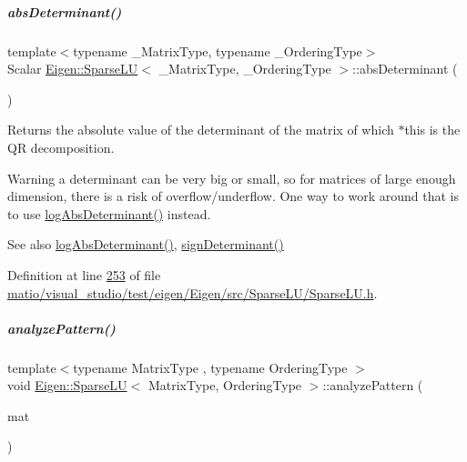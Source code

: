 \mbox{\label{group___sparse_l_u___module_a06fa89424239fb169d408f08252426d0}} 
\subparagraph{\texorpdfstring{abs\+Determinant()}{absDeterminant()}\hspace{0.1cm}{\footnotesize\ttfamily [2/2]}}
{\footnotesize\ttfamily template$<$typename \+\_\+\+Matrix\+Type, typename \+\_\+\+Ordering\+Type$>$ \\
Scalar \hyperlink{group___sparse_l_u___module_class_eigen_1_1_sparse_l_u}{Eigen\+::\+Sparse\+LU}$<$ \+\_\+\+Matrix\+Type, \+\_\+\+Ordering\+Type $>$\+::abs\+Determinant (\begin{DoxyParamCaption}{ }\end{DoxyParamCaption})\hspace{0.3cm}{\ttfamily [inline]}}

\begin{DoxyReturn}{Returns}
the absolute value of the determinant of the matrix of which $\ast$this is the QR decomposition.
\end{DoxyReturn}
\begin{DoxyWarning}{Warning}
a determinant can be very big or small, so for matrices of large enough dimension, there is a risk of overflow/underflow. One way to work around that is to use \hyperlink{group___sparse_l_u___module_a89e30a7df205596784a5a73f4768eaec}{log\+Abs\+Determinant()} instead.
\end{DoxyWarning}
\begin{DoxySeeAlso}{See also}
\hyperlink{group___sparse_l_u___module_a89e30a7df205596784a5a73f4768eaec}{log\+Abs\+Determinant()}, \hyperlink{group___sparse_l_u___module_a6651143e3b18fa90cfb3808b6fd23c4e}{sign\+Determinant()} 
\end{DoxySeeAlso}


Definition at line \hyperlink{matio_2visual__studio_2test_2eigen_2_eigen_2src_2_sparse_l_u_2_sparse_l_u_8h_source_l00253}{253} of file \hyperlink{matio_2visual__studio_2test_2eigen_2_eigen_2src_2_sparse_l_u_2_sparse_l_u_8h_source}{matio/visual\+\_\+studio/test/eigen/\+Eigen/src/\+Sparse\+L\+U/\+Sparse\+L\+U.\+h}.

\mbox{\label{group___sparse_l_u___module_aa907ff958c4f4855145091d2686f3a8a}} 
\subparagraph{\texorpdfstring{analyze\+Pattern()}{analyzePattern()}}
{\footnotesize\ttfamily template$<$typename Matrix\+Type , typename Ordering\+Type $>$ \\
void \hyperlink{group___sparse_l_u___module_class_eigen_1_1_sparse_l_u}{Eigen\+::\+Sparse\+LU}$<$ Matrix\+Type, Ordering\+Type $>$\+::analyze\+Pattern (\begin{DoxyParamCaption}\item[{const Matrix\+Type \&}]{mat }\end{DoxyParamCaption})}

